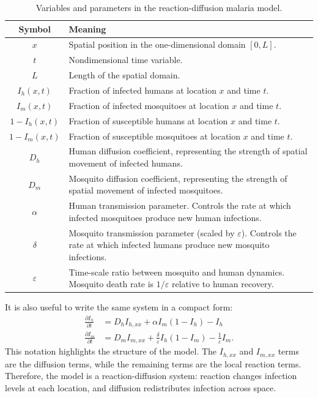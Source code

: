 \documentclass[12pt]{article}
\begin{document}
\begin{table}[h]
\centering
\begin{tabular}{c|p{}}
\hline
\textbf{Symbol} & \textbf{Meaning} \\
\hline
\(x\) & Spatial position in the one-dimensional domain \([0,L]\). \\
\(t\) & Nondimensional time variable. \\
\(L\) & Length of the spatial domain. \\
\(I_h(x,t)\) & Fraction of infected humans at location \(x\) and time \(t\). \\
\(I_m(x,t)\) & Fraction of infected mosquitoes at location \(x\) and time \(t\). \\
\(1-I_h(x,t)\) & Fraction of susceptible humans at location \(x\) and time \(t\). \\
\(1-I_m(x,t)\) & Fraction of susceptible mosquitoes at location \(x\) and time \(t\). \\
\(D_h\) & Human diffusion coefficient, representing the strength of spatial movement of infected humans. \\
\(D_m\) & Mosquito diffusion coefficient, representing the strength of spatial movement of infected mosquitoes. \\
\(\alpha\) & Human transmission parameter. Controls the rate at which infected mosquitoes produce new human infections. \\
\(\delta\) & Mosquito transmission parameter (scaled by \(\varepsilon\)). Controls the rate at which infected humans produce new mosquito infections. \\
\(\varepsilon\) & Time-scale ratio between mosquito and human dynamics. Mosquito death rate is \(1/\varepsilon\) relative to human recovery. \\
\hline
\end{tabular}
\caption{Variables and parameters in the reaction-diffusion malaria model.}
\label{tab:rd_parameters}
\end{table}

It is also useful to write the same system in a compact form:
\begin{align}
\frac{\partial I_h}{\partial t} &=
D_h I_{h,xx}+\alpha I_m(1-I_h)-I_h\\
\frac{\partial I_m}{\partial t}
&=
D_m I_{m,xx}+\frac{\delta}{\varepsilon} I_h(1-I_m)-\frac{1}{\varepsilon} I_m.
\end{align}
This notation highlights the structure of the model. The \(I_{h,xx}\) and \(I_{m,xx}\) terms are the diffusion terms, while the remaining terms are the local reaction terms. Therefore, the model is a reaction-diffusion system: reaction changes infection levels at each location, and diffusion redistributes infection across space.
\end{document}

